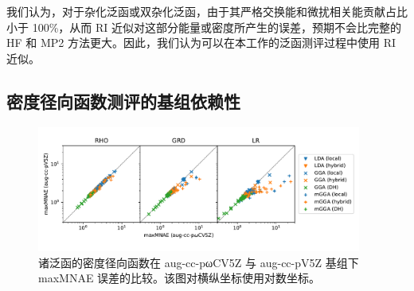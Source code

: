 我们认为，对于杂化泛函或双杂化泛函，由于其严格交换能和微扰相关能贡献占比小于 100\%，从而 RI 近似对这部分能量或密度所产生的误差，预期不会比完整的 HF 和 MP2 方法更大。因此，我们认为可以在本工作的泛函测评过程中使用 RI 近似。

\subsection{密度径向函数测评的基组依赖性}

\begin{figure}[t]
    \centering
    \includegraphics[width=0.95\textwidth]{assets/basisdep-RDF.pdf}
    \caption{诸泛函的密度径向函数在 aug-cc-pωCV5Z 与 aug-cc-pV5Z 基组下 maxMNAE 误差的比较。该图对横纵坐标使用对数坐标。}
    \label{fig.4.basisdep-RDF}
\end{figure}

